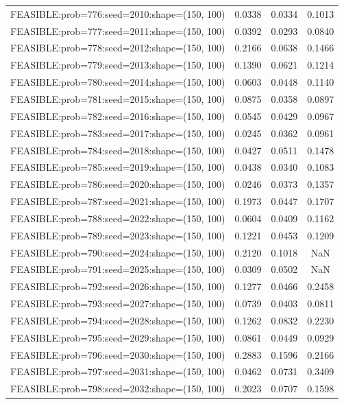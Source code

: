 \begin{longtable}{lccc}
FEASIBLE:prob=776:seed=2010:shape=(150, 100) & 0.0338 & 0.0334 & 0.1013 \\
FEASIBLE:prob=777:seed=2011:shape=(150, 100) & 0.0392 & 0.0293 & 0.0840 \\
FEASIBLE:prob=778:seed=2012:shape=(150, 100) & 0.2166 & 0.0638 & 0.1466 \\
FEASIBLE:prob=779:seed=2013:shape=(150, 100) & 0.1390 & 0.0621 & 0.1214 \\
FEASIBLE:prob=780:seed=2014:shape=(150, 100) & 0.0603 & 0.0448 & 0.1140 \\
FEASIBLE:prob=781:seed=2015:shape=(150, 100) & 0.0875 & 0.0358 & 0.0897 \\
FEASIBLE:prob=782:seed=2016:shape=(150, 100) & 0.0545 & 0.0429 & 0.0967 \\
FEASIBLE:prob=783:seed=2017:shape=(150, 100) & 0.0245 & 0.0362 & 0.0961 \\
FEASIBLE:prob=784:seed=2018:shape=(150, 100) & 0.0427 & 0.0511 & 0.1478 \\
FEASIBLE:prob=785:seed=2019:shape=(150, 100) & 0.0438 & 0.0340 & 0.1083 \\
FEASIBLE:prob=786:seed=2020:shape=(150, 100) & 0.0246 & 0.0373 & 0.1357 \\
FEASIBLE:prob=787:seed=2021:shape=(150, 100) & 0.1973 & 0.0447 & 0.1707 \\
FEASIBLE:prob=788:seed=2022:shape=(150, 100) & 0.0604 & 0.0409 & 0.1162 \\
FEASIBLE:prob=789:seed=2023:shape=(150, 100) & 0.1221 & 0.0453 & 0.1209 \\
FEASIBLE:prob=790:seed=2024:shape=(150, 100) & 0.2120 & 0.1018 &    NaN \\
FEASIBLE:prob=791:seed=2025:shape=(150, 100) & 0.0309 & 0.0502 &    NaN \\
FEASIBLE:prob=792:seed=2026:shape=(150, 100) & 0.1277 & 0.0466 & 0.2458 \\
FEASIBLE:prob=793:seed=2027:shape=(150, 100) & 0.0739 & 0.0403 & 0.0811 \\
FEASIBLE:prob=794:seed=2028:shape=(150, 100) & 0.1262 & 0.0832 & 0.2230 \\
FEASIBLE:prob=795:seed=2029:shape=(150, 100) & 0.0861 & 0.0449 & 0.0929 \\
FEASIBLE:prob=796:seed=2030:shape=(150, 100) & 0.2883 & 0.1596 & 0.2166 \\
FEASIBLE:prob=797:seed=2031:shape=(150, 100) & 0.0462 & 0.0731 & 0.3409 \\
FEASIBLE:prob=798:seed=2032:shape=(150, 100) & 0.2023 & 0.0707 & 0.1598 \\

\end{longtable}

